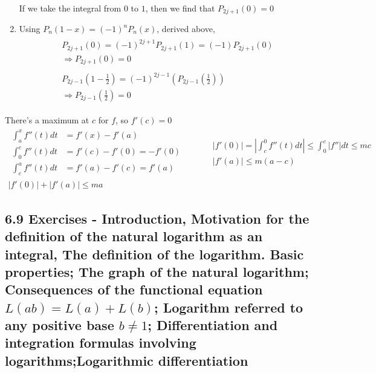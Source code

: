 \documentclass[twoside]{amsart}
\theoremstyle{plain}
\theoremstyle{definition}
\newcommand{\exercisehead}[1]
  {\smallskip
   \noindent{\small\bf Exercise #1.}}
\begin{document}
\begin{enumerate}
\[\begin{gathered}
\begin{aligned}
  \end{aligned} 
\end{gathered}
\]
If we take the integral from $0$ to $1$, then we find that $P_{2j+1}(0) = 0 $ 
\item Using $P_n(1-x) = (-1)^n P_n(x)$, derived above, 
\[
\begin{gathered}
  \begin{aligned}
    & P_{2j+1}(0) = (-1)^{2j+1} P_{2j+1}(1) = (-1) P_{2j+1}(0) \\
    & \Longrightarrow P_{2j+1}(0) = 0 
  \end{aligned} \\
\begin{aligned}
  & P_{2j-1}(1-\frac{1}{2}) = (-1)^{2j-1} (P_{2j-1}(\frac{1}{2}) ) \\
  & \Longrightarrow P_{2j-1}(\frac{1}{2}) = 0 
\end{aligned}
\end{gathered}
\]
\end{enumerate}

\exercisehead{36} There's a maximum at $c$ for $f$, so $f'(c) =0$
\[
\begin{gathered}
  \begin{aligned}
    \int_a^x f''(t)dt & = f'(x) - f'(a) \\
    \int_0^c f''(t) dt & = f'(c) - f'(0) = -f'(0) \\
    \int_c^a f''(t) dt & = f'(a) - f'(c) = f'(a)
  \end{aligned} \quad \quad \, 
\begin{aligned}
  & |f'(0)| = |\int_c^0 f''(t) dt | \leq \int_0^c |f''|dt \leq mc \\
  & |f'(a)| \leq m (a-c )
\end{aligned} \\
\boxed{ |f'(0)| + |f'(a)| \leq ma }
\end{gathered}
\]

\subsection*{ 6.9 Exercises - Introduction, Motivation for the definition of the natural logarithm as an integral, The definition of the logarithm.  Basic properties; The graph of the natural logarithm; Consequences of the functional equation $L(ab)=L(a)+L(b)$; Logarithm referred to any positive base $b\neq 1$; Differentiation and integration formulas involving logarithms;Logarithmic differentiation }
\quad \\
\end{document}
